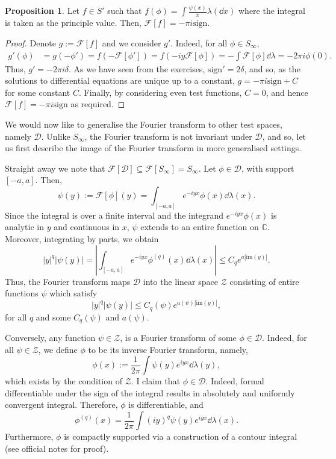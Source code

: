 \documentclass[]{article}
\theoremstyle{definition}
\theoremstyle{definition}
\newtheorem{proposition}{Proposition}[section]
\begin{document}
\begin{proposition}
  Let \(f \in S'\) such that \(f(\phi) = \int \frac{\psi(x)}{x} \lambda(\dd x)\) 
  where the integral is taken as the principle value. Then, 
  \(\mathcal{F}[f] = -\pi i\text{sign}\).
\end{proposition}
\begin{proof}
  Denote \(g := \mathcal{F}[f]\) and we consider \(g'\). Indeed, for all 
  \(\phi \in S_\infty\),
  \[\begin{split}
    g'(\phi) & = g(-\phi') = f(-\mathcal{F}[\phi']) = 
      f(-iy \mathcal{F}[\phi]) = -\int \mathcal{F}[\phi] \dd \lambda = 
      -2\pi i \phi(0). 
  \end{split}\]
  Thus, \(g' = - 2\pi i \delta\). As we have seen from the exercises, 
  \(\text{sign}' = 2\delta\), and so, as the solutions to differential equations 
  are unique up to a constant, \(g = -\pi i \text{sign} + C\) for some 
  constant \(C\). Finally, by considering even test functions, \(C = 0\), and 
  hence \(\mathcal{F}[f] = -\pi i\text{sign}\) as required.
\end{proof}

We would now like to generalise the Fourier transform to other test spaces, 
namely \(\mathcal{D}\). Unlike \(S_\infty\), the Fourier transform is not 
invariant under \(\mathcal{D}\), and so, let us first describe the image 
of the Fourier transform in more generalised settings.

Straight away we note that \(\mathcal{F}[\mathcal{D}] \subseteq 
\mathcal{F}[S_\infty] = S_\infty\). Let \(\phi \in \mathcal{D}\), 
with support \([-a, a]\). Then, 
\[\psi(y) := \mathcal{F}[\phi](y) = \int_{[-a, a]} e^{-iyx} \phi(x) \dd \lambda(x).\]
Since the integral is over a finite interval and the integrand 
\(e^{-iyx}\phi(x)\) is analytic in \(y\) and continuous in \(x\), \(\psi\)
extends to an entire function on \(\mathbb{C}\). Moreover, integrating by 
parts, we obtain 
\[|y|^q |\psi(y)| = \left|\int_{[-a, a]} e^{-iyx}\phi^{(q)}(x) \dd \lambda(x)\right|
  \le C_q e^{a|\text{im}(y)|}.\] 
Thus, the Fourier transform maps \(\mathcal{D}\) into the linear space \(\mathcal{Z}\) 
consisting of entire functions \(\psi\) which satisfy 
\[|y|^q |\psi(y)| \le C_q(\psi) e^{a(\psi)|\text{im}(y)|},\]
for all \(q\) and some \(C_q(\psi)\) and \(a(\psi)\).

Conversely, any function \(\psi \in \mathcal{Z}\), is a Fourier transform 
of some \(\phi \in \mathcal{D}\). Indeed, for all \(\psi \in \mathcal{Z}\), 
we define \(\phi\) to be its inverse Fourier transform, namely, 
\[\phi(x) := \frac{1}{2\pi} \int \psi(y) e^{iyx} \dd \lambda(y),\]
which exists by the condition of \(\mathcal{Z}\).
I claim that \(\phi \in \mathcal{D}\). Indeed, formal differentiable under the 
sign of the integral results in absolutely and uniformly convergent 
integral. Therefore, \(\phi\) is differentiable, and 
\[\phi^{(q)}(x) = \frac{1}{2\pi} \int (iy)^q \psi(y) e^{iyx} \dd \lambda(x).\]
Furthermore, \(\phi\) is compactly supported via a construction of a 
contour integral (see official notes for proof).
\end{document}
